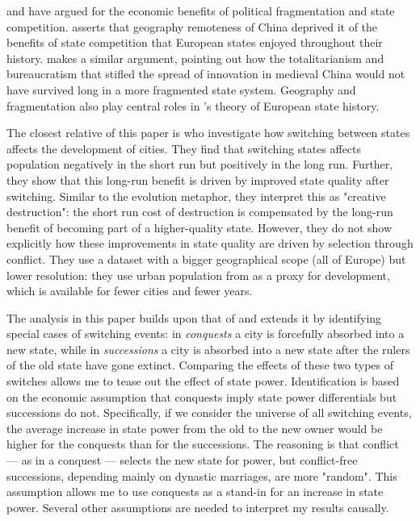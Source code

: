 \documentclass[11pt, a4paper]{article}
\begin{document}
\cite{diamond1997} and \cite{landes1969, landes2006} have argued for the economic benefits of political fragmentation and state competition. \cite{diamond1997} asserts that geography 
remoteness of China deprived it of the benefits of state competition that European states enjoyed throughout their history. \cite{landes2006} makes a similar argument, pointing out how the totalitarianism and bureaucratism that stifled the spread of innovation in medieval China would not have survived long in a more fragmented state system. Geography and fragmentation also play central roles in \cite{cervellati2022}'s theory of European state history.

The closest relative of this paper is \cite{schoenholzer2022} who investigate how switching between states affects the development of cities. They find that switching states affects population negatively in the short run but positively in the long run. Further, they show that this long-run benefit is driven by improved state quality after switching. Similar to the evolution metaphor, they interpret this as "creative destruction": the short run cost of destruction is compensated by the long-run benefit of becoming part of a higher-quality state. However, they do not show explicitly how these improvements in state quality are driven by selection through conflict. They use a dataset with a bigger geographical scope (all of Europe) but lower resolution: they use urban population from \cite{bairoch1988} as a proxy for development, which is available for fewer cities and fewer years.

The analysis in this paper builds upon that of \cite{schoenholzer2022} and extends it by identifying special cases of switching events: in \textit{conquests} a city is forcefully absorbed into a new state, while in \textit{successions} a city is absorbed into a new state after the rulers of the old state have gone extinct. Comparing the effects of these two types of switches allows me to tease out the effect of state power. Identification is based on the economic assumption that conquests imply state power differentials but successions do not. Specifically, if we consider the universe of all switching events, the average increase in state power from the old to the new owner would be higher for the conquests than for the successions. The reasoning is that conflict --- as in a conquest --- selects the new state for power, but conflict-free successions, depending mainly on dynastic marriages, are more "random". This assumption allows me to use conquests as a stand-in for an increase in state power. Several other assumptions are needed to interpret my results causally.
\end{document}
